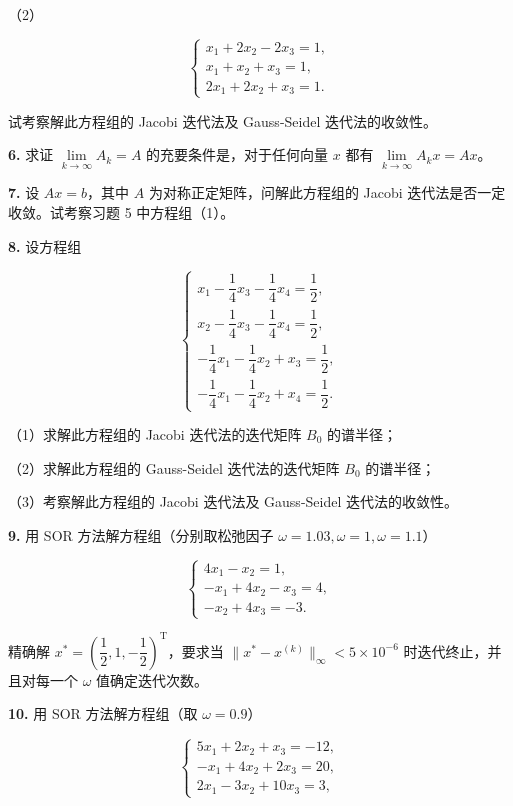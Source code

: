 （2）

\[
\begin{cases}
x_1+2x_2-2x_3=1,\\
x_1+x_2+x_3=1,\\
2x_1+2x_2+x_3=1.
\end{cases}
\]

试考察解此方程组的 Jacobi 迭代法及 Gauss-Seidel 迭代法的收敛性。

\textbf{6.} 求证 \(\lim\limits_{k\to\infty}A_k=A\) 的充要条件是，对于任何向量 \(x\) 都有 \(\lim\limits_{k\to\infty}A_kx=Ax\)。

\textbf{7.} 设 \(Ax=b\)，其中 \(A\) 为对称正定矩阵，问解此方程组的 Jacobi 迭代法是否一定收敛。试考察习题 5 中方程组（1）。

\textbf{8.} 设方程组

\[
\begin{cases}
x_1-\dfrac14x_3-\dfrac14x_4=\dfrac12,\\[5pt]
x_2-\dfrac14x_3-\dfrac14x_4=\dfrac12,\\[5pt]
-\dfrac14x_1-\dfrac14x_2+x_3=\dfrac12,\\[5pt]
-\dfrac14x_1-\dfrac14x_2+x_4=\dfrac12.
\end{cases}
\]

（1）求解此方程组的 Jacobi 迭代法的迭代矩阵 \(B_0\) 的谱半径；

（2）求解此方程组的 Gauss-Seidel 迭代法的迭代矩阵 \(B_0\) 的谱半径；

（3）考察解此方程组的 Jacobi 迭代法及 Gauss-Seidel 迭代法的收敛性。

\textbf{9.} 用 SOR 方法解方程组（分别取松弛因子 \(\omega=1.03,\omega=1,\omega=1.1\)）

\[
\begin{cases}
4x_1-x_2=1,\\
-x_1+4x_2-x_3=4,\\
-x_2+4x_3=-3.
\end{cases}
\]

精确解 \(x^*=\left(\dfrac12,1,-\dfrac12\right)^{\mathrm T}\)，要求当 \(\|x^*-x^{(k)}\|_\infty<5\times10^{-6}\) 时迭代终止，并且对每一个 \(\omega\) 值确定迭代次数。

\textbf{10.} 用 SOR 方法解方程组（取 \(\omega=0.9\)）

\[
\begin{cases}
5x_1+2x_2+x_3=-12,\\
-x_1+4x_2+2x_3=20,\\
2x_1-3x_2+10x_3=3,
\end{cases}
\]

